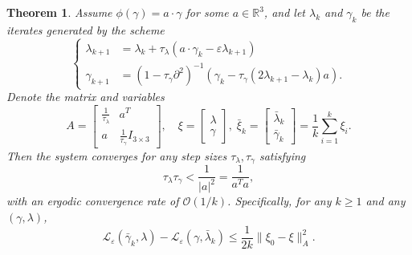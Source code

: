 \documentclass[12pt]{amsart}
\newcommand{\R}{\mathbb{R}}
\newtheorem{theorem}{Theorem}
\theoremstyle{definition}
\theoremstyle{remark}
\numberwithin{equation}{section}
\numberwithin{equation}{section}
\begin{document}
\begin{theorem}
    Assume $\phi(\gamma) = a\cdot \gamma$ for some $a \in \R^3$, and let $\lambda_k$ and $\gamma_k$ be the iterates generated by the  scheme
    \[\begin{cases}
        \lambda_{k+1} & = \lambda_k + \tau_{\lambda}(a\cdot\gamma_k - \varepsilon\lambda_{k+1})\\
        \gamma_{k+1} &= (1-\tau_{\gamma}\partial^2)^{-1}(\gamma_k - \tau_{\gamma}(2\lambda_{k+1}-\lambda_k)a).
    \end{cases}\]
    Denote the matrix and variables 
    $$
    A = \begin{bmatrix}
    \frac{1}{\tau_{\lambda}} & a^T\\
    a & \frac{1}{\tau_{\gamma}}I_{3\times 3}
\end{bmatrix}, \quad \xi = \begin{bmatrix}
    \lambda\\ \gamma
\end{bmatrix}, \;  \bar{\xi}_k = \begin{bmatrix}
    \bar{\lambda}_k\\ \bar{\gamma}_k
\end{bmatrix} = \frac{1}{k}\sum_{i=1}^k \xi_i.
$$ 
Then the system converges for any step sizes $\tau_{\lambda}, \tau_{\gamma}$ satisfying  
\[
\tau_{\lambda}\tau_{\gamma} < \frac{1}{|a|^2} = \frac{1}{a^Ta},
\]
with an ergodic convergence rate of $\mathcal{O}(1/k)$. Specifically, for any $k\geq 1$ and any $(\gamma, \lambda)$, 
\[\mathcal{L}_{\varepsilon}(\bar{\gamma}_k, \lambda) - \mathcal{L}_{\varepsilon}(\gamma, \bar{\lambda}_k) \leq \frac{1}{2k}\|\xi_0 - \xi\|^2_A. \]
\end{theorem}
\end{document}
